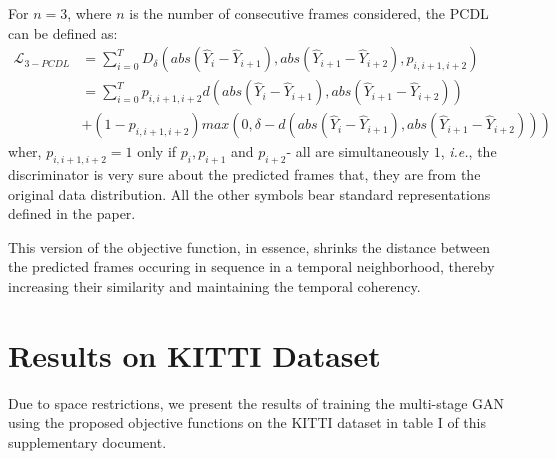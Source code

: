 \documentclass{article}
\begin{document}
  For $ n = 3 $, where $ n $ is the number of consecutive frames considered, the PCDL can be defined as:
  \begin{equation}
	\label{eq:3pcdl}
  	\begin{split}
  	\mathcal{L}_{3-PCDL} & = \sum_{i = 0}^{T} D_{\delta}(abs(\hat{Y}_i - \hat{Y}_{i + 1}), abs(\hat{Y}_{i + 1} - \hat{Y}_{i + 2}), p_{i, i+1, i+2}) \\
  	& = \sum_{i = 0}^{T} p_{i,i+1,i+2} d(abs(\hat{Y}_i - \hat{Y}_{i + 1}), abs(\hat{Y}_{i + 1} - \hat{Y}_{i + 2})) \\
  	& + (1 - p_{i,i+1,i+2}) max(0, \delta - d(abs(\hat{Y}_i - \hat{Y}_{i + 1}), abs(\hat{Y}_{i + 1} - \hat{Y}_{i + 2})))
  	\end{split}
  \end{equation} 
  wher, $ p_{i,i+1,i+2} = 1 $ only if $ p_i, p_{i+1} $ and $ p_{i+2} $- all are simultaneously $ 1 $, \textit{i.e.}, the discriminator is very sure about the predicted frames that, they are from the original data distribution. All the other symbols bear standard representations defined in the paper.
  
  This version of the objective function, in essence, shrinks the distance between the predicted frames occuring in sequence in a temporal neighborhood, thereby increasing their similarity and maintaining the temporal coherency.
  
  \section{Results on KITTI Dataset}
  Due to space restrictions, we present the results of training the multi-stage GAN using the proposed objective functions on the KITTI dataset in table I of this supplementary document.
  
\end{document}
